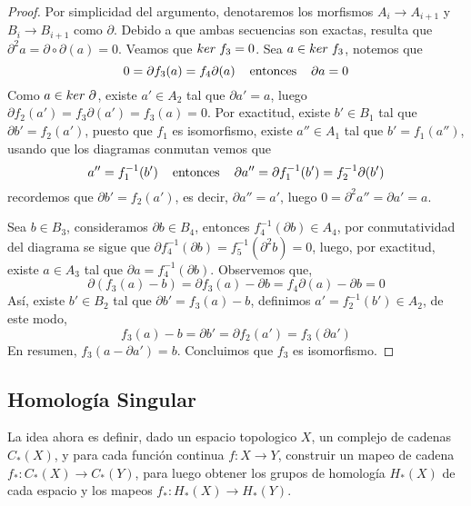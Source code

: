 \documentclass[aop]{imsart2}
\theoremstyle{plain}
\theoremstyle{remark}
\newcommand{\hhtext}[1]{\hspace{4mm}\text{#1}\hspace{4mm}}
\newcommand{\kr}[1]{ker\hspace{1mm}#1}
\begin{document}
\begin{proof}
    Por simplicidad del argumento, denotaremos los morfismos $A_{i}\to A_{i+1}$ y 
    $B_{i}\to B_{i+1}$ como $\partial$. Debido a que ambas secuencias son exactas, resulta que 
    $\partial^{2}a=\partial\circ\partial (a)=0$. Veamos que $\kr{f_{3}}=0$. Sea $a\in\kr{f_{3}}$,
    notemos que
    \begin{equation*}
        0=\partial f_{3}(a)=f_{4}\partial(a)\hhtext{entonces}\partial a=0
    \end{equation*}
    Como $a\in\kr\partial$, existe $a'\in A_{2}$ tal que $\partial a'=a$, luego 
    $\partial f_{2}(a')=f_{3}\partial(a')=f_{3}(a)=0$. Por exactitud, existe $b'\in B_{1}$ tal que 
    $\partial b'=f_{2}(a')$, puesto que $f_{1}$ es isomorfismo, existe $a''\in A_{1}$ tal que 
    $b'=f_{1}(a'')$, usando que los diagramas conmutan vemos que
    \begin{equation*}
        a''=f^{-1}_{1}(b')\hhtext{entonces}\partial a''=\partial f^{-1}_{1}(b')
        =f^{-1}_{2}\partial(b')
    \end{equation*}
    recordemos que $\partial b'=f_{2}(a')$, es decir, $\partial a''=a'$, luego 
    $0=\partial^{2}a''=\partial a'=a$.

    \vspace{2mm}
    \noindent Sea $b\in B_{3}$, consideramos $\partial b\in B_{4}$, entonces 
    $f^{-1}_{4}(\partial b)\in A_{4}$, por conmutatividad del diagrama se sigue que
    $\partial f_{4}^{-1}(\partial b)=f_{5}^{-1}(\partial^{2}b)=0$, luego, por exactitud, existe
    $a\in A_{3}$ tal que $\partial a=f_{4}^{-1}(\partial b)$. Observemos que,
    \begin{equation*}
        \partial(f_{3}(a)-b)=\partial f_{3}(a)-\partial b=f_{4}\partial(a)-\partial b=0
    \end{equation*}
    Así, existe $b'\in B_{2}$ tal que $\partial b'=f_{3}(a)-b$, definimos 
    $a'=f_{2}^{-1}(b')\in A_{2}$, de este modo,
    \begin{equation*}
        f_{3}(a)-b=\partial b'=\partial f_{2}(a')=f_{3}(\partial a')
    \end{equation*}
    En resumen, $f_{3}(a-\partial a')=b$. Concluimos que $f_{3}$ es isomorfismo.
\end{proof}

\subsection{Homología Singular}
La idea ahora es definir, dado un espacio topologico $X$, un complejo de cadenas 
$C_{*}(X)$, y para cada función continua $f:X\to Y$, construir un mapeo de cadena $f_{*}:C_{*}(X)
\to C_{*}(Y)$, para luego obtener los grupos de homología $H_{*}(X)$ de cada espacio y los mapeos
$f_{*}:H_{*}(X)\to H_{*}(Y)$.
\end{document}
